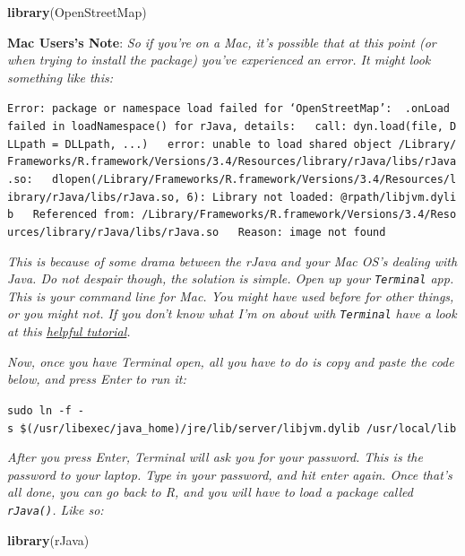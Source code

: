 \documentclass[]{book}
\newenvironment{Shaded}{\begin{snugshade}}{\end{snugshade}}
\newcommand{\KeywordTok}[1]{\textcolor[rgb]{0.13,0.29,0.53}{\textbf{#1}}}
\newcommand{\NormalTok}[1]{#1}
\begin{document}
\begin{Shaded}
\begin{Highlighting}[]
\KeywordTok{library}\NormalTok{(OpenStreetMap)}
\end{Highlighting}
\end{Shaded}

\textbf{Mac Users's Note}: \emph{So if you're on a Mac, it's possible that at this point (or when trying to install the package) you've experienced an error. It might look something like this:}

\texttt{Error:\ package\ or\ namespace\ load\ failed\ for\ ‘OpenStreetMap’:\ \ .onLoad\ failed\ in\ loadNamespace()\ for\ \textquotesingle{}rJava\textquotesingle{},\ details:\ \ \ call:\ dyn.load(file,\ DLLpath\ =\ DLLpath,\ ...)\ \ \ error:\ unable\ to\ load\ shared\ object\ \textquotesingle{}/Library/Frameworks/R.framework/Versions/3.4/Resources/library/rJava/libs/rJava.so\textquotesingle{}:\ \ \ dlopen(/Library/Frameworks/R.framework/Versions/3.4/Resources/library/rJava/libs/rJava.so,\ 6):\ Library\ not\ loaded:\ @rpath/libjvm.dylib\ \ \ Referenced\ from:\ /Library/Frameworks/R.framework/Versions/3.4/Resources/library/rJava/libs/rJava.so\ \ \ Reason:\ image\ not\ found}

\emph{This is because of some drama between the rJava and your Mac OS's dealing with Java. Do not despair though, the solution is simple. Open up your \texttt{Terminal} app. This is your command line for Mac. You might have used before for other things, or you might not. If you don't know what I'm on about with \texttt{Terminal} have a look at this \href{https://www.macworld.co.uk/feature/mac-software/how-use-terminal-on-mac-3608274/}{helpful tutorial}.}

\emph{Now, once you have Terminal open, all you have to do is copy and paste the code below, and press Enter to run it:}

\texttt{sudo\ ln\ -f\ -s\ \$(/usr/libexec/java\_home)/jre/lib/server/libjvm.dylib\ /usr/local/lib}

\emph{After you press Enter, Terminal will ask you for your password. This is the password to your laptop. Type in your password, and hit enter again. Once that's all done, you can go back to R, and you will have to load a package called \texttt{rJava()}. Like so:}

\begin{Shaded}
\begin{Highlighting}[]
\KeywordTok{library}\NormalTok{(rJava)}
\end{Highlighting}
\end{Shaded}
\end{document}
